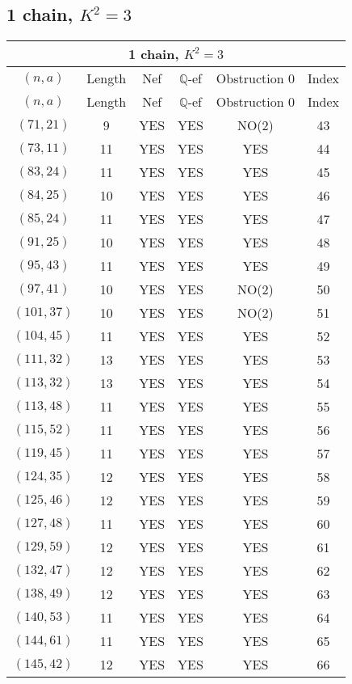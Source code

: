 \subsection{1 chain, $K^2 = 3$}
\begin{longtable}{|c|c|c|c|c|c|}
\hline
\multicolumn{6}{|c|}{1 chain, $K^2 = 3$}\\
\hline
$(n,a)$ & Length & Nef & $\mathbb Q$-ef & Obstruction 0 & Index\\
\hline
\endfirsthead

\hline
$(n,a)$ & Length & Nef & $\mathbb Q$-ef & Obstruction 0 & Index\\
\hline
\endhead
\hline
\endfoot

$(71, 21)$ & 9 & YES & YES & NO(2) & 43\\
$(73, 11)$ & 11 & YES & YES & YES & 44\\
$(83, 24)$ & 11 & YES & YES & YES & 45\\
$(84, 25)$ & 10 & YES & YES & YES & 46\\
$(85, 24)$ & 11 & YES & YES & YES & 47\\
$(91, 25)$ & 10 & YES & YES & YES & 48\\
$(95, 43)$ & 11 & YES & YES & YES & 49\\
$(97, 41)$ & 10 & YES & YES & NO(2) & 50\\
$(101, 37)$ & 10 & YES & YES & NO(2) & 51\\
$(104, 45)$ & 11 & YES & YES & YES & 52\\
$(111, 32)$ & 13 & YES & YES & YES & 53\\
$(113, 32)$ & 13 & YES & YES & YES & 54\\
$(113, 48)$ & 11 & YES & YES & YES & 55\\
$(115, 52)$ & 11 & YES & YES & YES & 56\\
$(119, 45)$ & 11 & YES & YES & YES & 57\\
$(124, 35)$ & 12 & YES & YES & YES & 58\\
$(125, 46)$ & 12 & YES & YES & YES & 59\\
$(127, 48)$ & 11 & YES & YES & YES & 60\\
$(129, 59)$ & 12 & YES & YES & YES & 61\\
$(132, 47)$ & 12 & YES & YES & YES & 62\\
$(138, 49)$ & 12 & YES & YES & YES & 63\\
$(140, 53)$ & 11 & YES & YES & YES & 64\\
$(144, 61)$ & 11 & YES & YES & YES & 65\\
$(145, 42)$ & 12 & YES & YES & YES & 66\\

\end{longtable}
